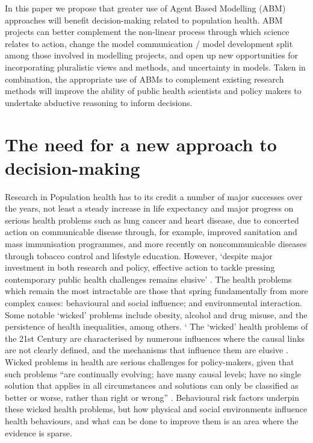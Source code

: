 \documentclass[review]{elsarticle}
\begin{document}
In this paper we propose that greater use of Agent Based Modelling (ABM) approaches will benefit decision-making related to population health. ABM projects can better complement the non-linear process through which science relates to action, change the model communication / model development split among those involved in modelling projects, and open up new opportunities for incorporating pluralistic views and methods, and uncertainty in models. Taken in combination, the appropriate use of ABMs to complement existing research methods will improve the ability of public health scientists and policy makers to undertake abductive reasoning to inform decisions.


\section{The need for a new approach to decision-making}


Research in Population health has to its credit a number of major successes over the years, not least a steady increase in life expectancy and major progress on serious health problems such as lung cancer and heart disease, due to concerted action on communicable disease through, for example, improved sanitation and mass immunisation programmes, and more recently on noncommunicable diseases through tobacco control and lifestyle education.  However, `despite major investment in both research and policy, effective action to tackle pressing contemporary public health challenges remains elusive' \citep{rutter2017}. The health problems which remain the most intractable are those that spring fundamentally from more complex causes: behavioural and social influence; and environmental interaction.  Some notable `wicked' problems include obesity, alcohol and drug misuse, and the persistence of health inequalities, among others.
`
The `wicked' health problems of the 21st Century are characterised by numerous influences where the causal links are not clearly defined, and the mechanisms that influence them are elusive \citep{rittel1973}. Wicked problems in health are serious challenges for policy-makers, given that such problems ``are continually evolving; have many causal levels; have no single solution that applies in all circumstances and solutions can only be classified as better or worse, rather than right or wrong'' \citep{signal2013}.  Behavioural risk factors underpin these wicked health problems, but how physical and social environments influence health behaviours, and what can be done to improve them is an area where the evidence is sparse. 
\end{document}
